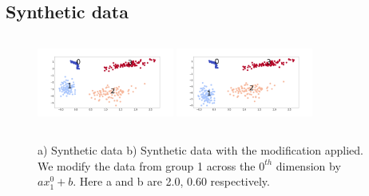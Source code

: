 \subsection{Synthetic data}
\begin{figure}[H]
    \centering
    \includegraphics[width=0.4\textwidth, height=3cm]{../openreview/images/synthetic/synth-rep.png}
    \includegraphics[width=0.4\textwidth, height=3cm]{../openreview/images/synthetic/modified.png}
    \caption{a) Synthetic data b) Synthetic data with the modification applied. We modify the data from group 1 across the $0^{th}$ dimension by $ax_{1}^{0} + b$. Here a and b are 2.0, 0.60 respectively.}
    \label{fig:synth_modified}
\end{figure}

